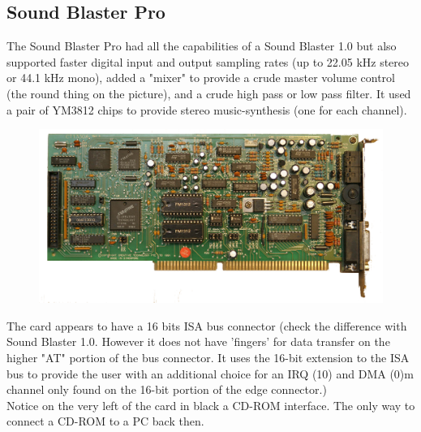 \documentclass[book.tex]{subfiles}
\begin{document}
  \subsection{Sound Blaster Pro}
The Sound Blaster Pro had all the capabilities of a Sound Blaster 1.0 but also supported faster digital input and output sampling rates (up to 22.05 kHz stereo or 44.1 kHz mono), added a "mixer" to provide a crude master volume control (the round thing on the picture), and a crude high pass or low pass filter. It used a pair of YM3812 chips to provide stereo music-synthesis (one for each channel).\\
\begin{figure}[H] \centering \includegraphics[width=\textwidth]{imgs/hardware/sbpro.png} \end{figure}
 The card appears to have a 16 bits ISA bus connector (check the difference with Sound Blaster 1.0. However it does not have 'fingers' for data transfer on the higher "AT" portion of the bus connector. It uses the 16-bit extension to the ISA bus to provide the user with an additional choice for an IRQ (10) and DMA (0)m channel only found on the 16-bit portion of the edge connector.)\\
 Notice on the very left of the card in black a CD-ROM interface. The only way to connect a CD-ROM to a PC back then.
\end{document}
